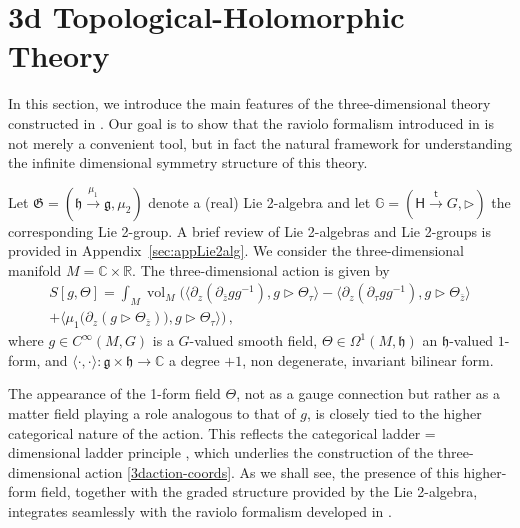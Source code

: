 \documentclass[11pt]{amsart}
\newcommand{\R}{{\mathbb R}}
\newcommand{\fg}{\mathfrak{g}}
\newcommand{\fh}{\mathfrak{h}}
\newcommand{\fG}{\mathfrak{G}}
\numberwithin{equation}{section}
\numberwithin{figure}{section}
\numberwithin{table}{section}
\theoremstyle{thm}
\numberwithin{equation}{subsection}
\theoremstyle{definition}
\theoremstyle{rem}
\begin{document}
\section{3d Topological-Holomorphic Theory}

\label{sec:3dtheory}



In this section, we introduce the main features of the three-dimensional theory constructed in \cite{Chen:2024axr}. Our goal is to show that the raviolo formalism introduced in \cite{Garner:2023zqn} is not merely a convenient tool, but in fact the natural framework for understanding the infinite dimensional symmetry structure of this theory. 




Let $\fG=(\fh\xrightarrow{\mu_1}\fg,\mu_2)$ denote a (real) Lie 2-algebra and let $\mathbb{G}=(\mathsf{H}\xrightarrow{\mathsf{t}}G,\rhd)$ the corresponding Lie 2-group. A brief review of Lie 2-algebras and Lie 2-groups is provided in Appendix~\ref{sec:appLie2alg}. We consider the three-dimensional manifold $M=\mathbb{C}\times \R$. The three-dimensional action is given by \cite{Chen:2024axr}
\begin{multline}
       S[g,\Theta] = \int_M \operatorname{vol}_M \Big(\langle \partial_z (\partial_{\bar z}gg^{-1}), g\rhd\Theta_\tau\rangle - \langle \partial_z (\partial_\tau gg^{-1}),g\rhd\Theta_{\bar z}\rangle \\
       +\langle \mu_1\big(\partial_z (g\rhd\Theta_{\bar z})\big),g\rhd\Theta_\tau\rangle\Big)\,,\label{3daction-coords} 
\end{multline}
where $g\in C^{\infty}(M,G)$ is a $G$-valued smooth field, $\Theta \in \Omega^{1}(M,\fh)$ an $\fh$-valued $1$-form, and $\langle\cdot,\cdot\rangle:\fg \times \fh \to \mathbb{C}$ a degree $+1$, non degenerate, invariant bilinear form.



The appearance of the 1-form field \(\Theta\), not as a gauge connection but rather as a matter field playing a role analogous to that of \(g\), is closely tied to the higher categorical nature of the action. This reflects the categorical ladder = dimensional ladder principle \cite{Crane:1994ty, Baez:1995xq}, which underlies the construction of the three-dimensional action \eqref{3daction-coords}. As we shall see, the presence of this higher-form field, together with the graded structure provided by the Lie 2-algebra, integrates seamlessly with the raviolo formalism developed in \cite{Garner:2023zqn}.
\end{document}
